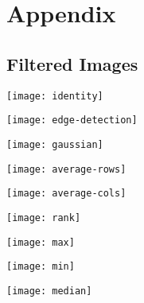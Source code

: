 \appendix

\section{Appendix} \label{a}
	\subsection{Filtered Images} \label{a:filters}
		\begin{center}
			\texttt{[image: identity]}
			\label{a:filters:identity}
		\end{center}

		\begin{center}
			\texttt{[image: edge-detection]}
			\label{a:filters:edgeDetection}
		\end{center}

		\begin{center}
			\texttt{[image: gaussian]}
			\label{a:filters:gaussian}
		\end{center}

		\begin{center}
			\texttt{[image: average-rows]}
			\label{a:filters:averageRows}
		\end{center}

		\begin{center}
			\texttt{[image: average-cols]}
			\label{a:filters:averageCols}
		\end{center}

		\begin{center}
			\texttt{[image: rank]}
			\label{a:filters:rank}
		\end{center}

		\begin{center}
			\texttt{[image: max]}
			\label{a:filters:max}
		\end{center}

		\begin{center}
			\texttt{[image: min]}
			\label{a:filters:min}
		\end{center}

		\begin{center}
			\texttt{[image: median]}
			\label{a:filters:median}
		\end{center}
